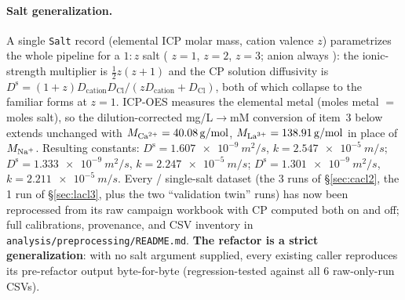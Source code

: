 \documentclass[11pt]{article}
\begin{document}
\paragraph{Salt generalization.} A single \texttt{Salt}
record (elemental ICP molar mass, cation valence $z$) parametrizes the whole
pipeline for a $1{:}z$ salt ( $z=1$,  $z=2$, 
$z=3$; anion always ): the ionic-strength multiplier is $\tfrac12
z(z+1)$ and the CP solution diffusivity is $D^{\mathrm s}=(1+z)D_{\text{cation}}
D_{\mathrm{Cl}}/(zD_{\text{cation}}+D_{\mathrm{Cl}})$, both of which collapse to
the familiar  forms at $z=1$. ICP-OES measures the elemental metal
(moles metal $=$ moles salt), so the dilution-corrected mg/L$\to$mM conversion
of item~3 below extends unchanged with $M_{\ce{Ca^{2+}}}=\SI{40.08}{g/mol}$,
$M_{\ce{La^{3+}}}=\SI{138.91}{g/mol}$ in place of $M_{\ce{Na+}}$. Resulting
constants:  $D^{\mathrm s}=\SI{1.607e-9}{m^2/s}$,
$k=\SI{2.547e-5}{m/s}$;  $D^{\mathrm s}=\SI{1.333e-9}{m^2/s}$,
$k=\SI{2.247e-5}{m/s}$;  $D^{\mathrm s}=\SI{1.301e-9}{m^2/s}$,
$k=\SI{2.211e-5}{m/s}$. Every / single-salt dataset (the 3
 runs of \S\ref{sec:cacl2}, the 1  run of \S\ref{sec:lacl3},
plus the two  ``validation twin'' runs) has now been reprocessed from
its raw campaign workbook with CP computed both on and off; full
calibrations, provenance, and CSV inventory in
\texttt{analysis/preprocessing/README.md}. \textbf{The refactor is a strict
generalization}: with no salt argument supplied, every existing 
caller reproduces its pre-refactor output byte-for-byte (regression-tested
against all 6 raw-only-run CSVs).
\end{document}
